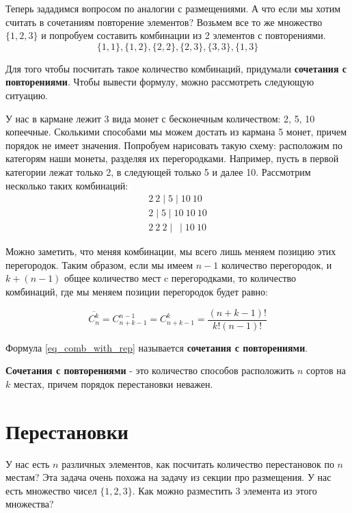 Теперь зададимся вопросом по аналогии с размещениями. А что если мы хотим считать в сочетаниям повторение
элементов? Возьмем все то же множество $\{1, 2, 3\}$ и попробуем составить комбинации
из 2 элементов с повторениями.
\begin{equation}
    \{1, 1\}, \{1, 2\}, \{2, 2\}, \{2, 3\}, \{3, 3\}, \{1, 3\}
\end{equation}

Для того чтобы посчитать такое количество комбинаций, придумали 
\textbf{сочетания с повторениями}. Чтобы вывести формулу, можно рассмотреть следующую
ситуацию.

У нас в кармане лежит 3 вида монет с бесконечным количеством: 2, 5, 10 копеечные.
Сколькими способами мы можем достать из кармана 5 монет, причем порядок не имеет значения.
Попробуем нарисовать такую схему: расположим по категорям наши монеты, разделяя их перегородками.
Например, пусть в первой категории лежат только 2, в следующей только 5 и далее 10. Рассмотрим несколько
таких комбинаций:
\begin{gather*}
    2 \ 2 \mid 5 \mid 10 \ 10  \\
    2  \mid 5 \mid 10 \ 10 \ 10 \\
    2 \ 2 \ 2 \mid  \ \mid 10 \ 10 
\end{gather*} 

Можно заметить, что меняя комбинации, мы всего лишь меняем позицию этих перегородок.
Таким образом, если мы имеем $n - 1$ количество перегородок, и $k + (n - 1)$ 
общее количество мест c перегородками, то количество комбинаций, где мы меняем позиции перегородок будет равно:

\begin{equation}\label{eq_comb_with_rep}
    \overline {C^k_n} = C^{n - 1}_{n + k - 1} = C^{k}_{n + k - 1} = \frac{(n + k - 1)!}{k!(n-1)!}
\end{equation}

Формула \ref{eq_comb_with_rep} называется \textbf{сочетания с повторениями}.
\begin{utv}
    \textbf{Сочетания с повторениями} - это количество способов расположить $n$ сортов на $k$ местах,
    причем порядок перестановки неважен.
\end{utv}

\section{Перестановки}
У нас есть $n$ различных элементов, как посчитать количество перестановок
по $n$ местам? Эта задача очень похожа на задачу из секции про размещения.
У нас есть множество чисел $\{1, 2, 3\}$. Как можно разместить 3 элемента из этого множества?

